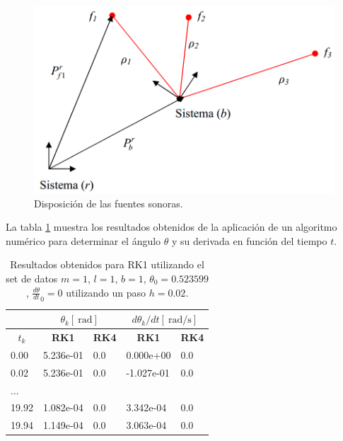 \begin{figure}[ht]
	\centering
	\includegraphics[scale=0.35]{includes/4_sound_sources_diagram.png}
	\caption{Disposición de las fuentes sonoras.} \label{4_sound_sources_diagram}
\end{figure}


La tabla \ref{tabla_ej2} muestra los resultados obtenidos de la aplicación de un algoritmo numérico para determinar el ángulo $\theta$ y su derivada en función del tiempo $t$.

\begin{table}[!ht]
	\centering
	\begin{tabular}{|l|l|l|l|l|}
		\hline
		\multicolumn{1}{|c|}{} & \multicolumn{2}{c|}{\textbf{$\theta_k[\SI{}{\radian}]$}} & \multicolumn{2}{c|}{\textbf{$d\theta_k/dt[\SI{}{\radian\per\second}]$}} \\ \hline
		\multicolumn{1}{|c|}{\textbf{$t_k$}} & \multicolumn{1}{c|}{\textbf{RK1}} & \multicolumn{1}{c|}{\textbf{RK4}} & \multicolumn{1}{c|}{\textbf{RK1}} & \multicolumn{1}{c|}{\textbf{RK4}} \\ \hline
		0.00 & 5.236e-01 & 0.0 & 0.000e+00 &  0.0 \\ \hline
		0.02 & 5.236e-01 & 0.0 & -1.027e-01 & 0.0  \\ \hline
		... &  &  &  &  \\ \hline
		19.92 & 1.082e-04 & 0.0 & 3.342e-04 & 0.0 \\ \hline
		19.94 & 1.149e-04 & 0.0 & 3.063e-04 & 0.0 \\ \hline
	\end{tabular}
	\caption{Resultados obtenidos para RK1 utilizando el set de datos $m=1$, $l=1$, $b=1$, $\theta_0=0.523599$, $\frac{d\theta}{dt}_0=0$ utilizando un paso $h = 0.02$.}
	\label{tabla_ej2}
\end{table}

